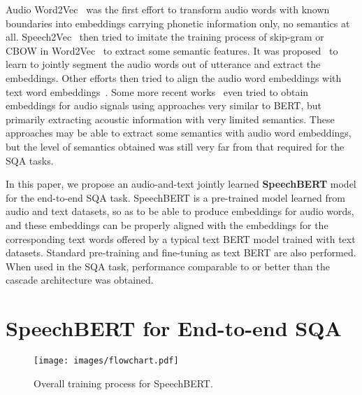 \documentclass[a4paper]{article}
\begin{document}
Audio Word2Vec~\cite{chung2016audio} was the first effort to transform audio words with known boundaries into embeddings carrying phonetic information only, no semantics at all. Speech2Vec~\cite{speech2vec2018} then tried to imitate the training process of skip-gram or CBOW in Word2Vec~\cite{mikolov2013distributed} to extract some semantic features. It was proposed~\cite{wang2018segmental} to learn to jointly segment the audio words out of utterance and extract the embeddings. Other efforts then tried to align the audio word embeddings with text word embeddings~\cite{yichen2018, chung2019nips}. Some more recent works~\cite{liu2019mockingjay, baevski2019vq, jiang2019improving, song2019speech, fan2019unsupervised, ling2019deep} even tried to obtain embeddings for audio signals using approaches very similar to BERT, but primarily extracting acoustic information with very limited semantics. These approaches may be able to extract some semantics with audio word embeddings, but the level of semantics obtained was still very far from that required for the SQA tasks.

In this paper, we propose an audio-and-text jointly learned \textbf{SpeechBERT} model for the end-to-end SQA task. SpeechBERT is a pre-trained model learned from audio and text datasets, so as to be able to produce embeddings for audio words, and these embeddings can be properly aligned with the embeddings for the corresponding text words offered by a typical text BERT model trained with text datasets. Standard pre-training and fine-tuning as text BERT are also performed. When used in the SQA task, performance comparable to or better than the cascade architecture was obtained.


 

\vspace{-5pt}
\section{SpeechBERT for End-to-end SQA}
\label{sec:SpeechBERT}

\begin{figure}[t!]
    \centering
    \texttt{[image: images/flowchart.pdf]}
    \caption{Overall training process for SpeechBERT.}
    \label{fig:1}
    \vspace{-15pt}
\end{figure}
\vspace{-5pt}
\end{document}
